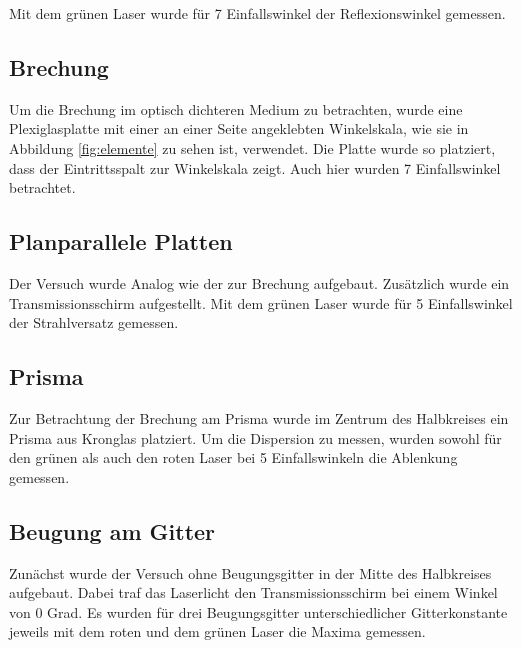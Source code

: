 Mit dem grünen Laser wurde für 7 Einfallswinkel der Reflexionswinkel gemessen.

\subsection{Brechung}
Um die Brechung im optisch dichteren Medium zu betrachten, wurde eine Plexiglasplatte
mit einer an einer Seite angeklebten Winkelskala,
wie sie in Abbildung \ref{fig:elemente} zu sehen ist, verwendet. Die 
Platte wurde so platziert, dass der Eintrittsspalt zur Winkelskala zeigt.
Auch hier wurden 7 Einfallswinkel betrachtet.

\subsection{Planparallele Platten}
Der Versuch wurde Analog wie der zur Brechung aufgebaut. Zusätzlich wurde
ein Transmissionsschirm aufgestellt. Mit dem grünen Laser wurde 
für 5 Einfallswinkel der 
Strahlversatz gemessen.

\subsection{Prisma}
Zur Betrachtung der Brechung am Prisma wurde im Zentrum des Halbkreises
ein Prisma aus Kronglas platziert. Um die Dispersion zu messen, wurden sowohl 
für den grünen als auch den roten Laser bei 5 Einfallswinkeln die Ablenkung gemessen.

\subsection{Beugung am Gitter}
Zunächst wurde der Versuch ohne Beugungsgitter in der Mitte des Halbkreises aufgebaut.
Dabei traf das Laserlicht den Transmissionsschirm bei einem Winkel von 0 Grad. 
Es wurden für drei Beugungsgitter unterschiedlicher Gitterkonstante
jeweils mit dem roten und dem grünen Laser die 
Maxima gemessen. 